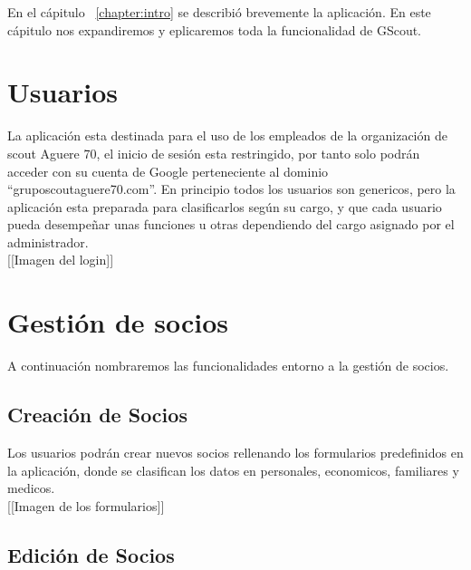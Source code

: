 


En el cápitulo ~\ref{chapter:intro} se describió brevemente la aplicación. En este cápitulo nos expandiremos y eplicaremos toda la funcionalidad de GScout.

\section{Usuarios}
\label{3:sec1}

La aplicación esta destinada para el uso de los empleados de la organización de scout Aguere 70, el inicio de sesión esta restringido, por tanto solo podrán 
acceder con su cuenta de Google perteneciente al dominio ``gruposcoutaguere70.com''. En principio todos los usuarios son genericos, pero la aplicación esta preparada
para clasificarlos según su cargo, y que cada usuario pueda desempeñar unas funciones u otras dependiendo del cargo asignado por el administrador.\\


[[Imagen del login]]


\section{Gestión de socios}
\label{3:sec2}

A continuación nombraremos las funcionalidades entorno a la gestión de socios.

\subsection{Creación de Socios}

Los usuarios podrán crear nuevos socios rellenando los formularios predefinidos en la aplicación, donde se clasifican los datos en personales, economicos, familiares y medicos.\\

[[Imagen de los formularios]]

\subsection{Edición de Socios}

